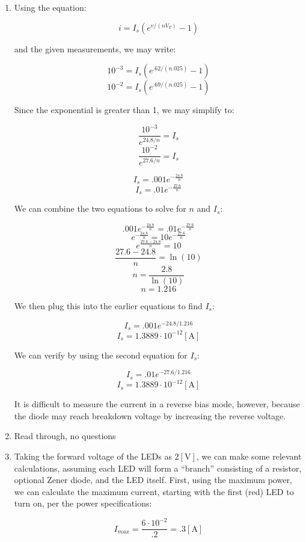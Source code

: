 \begin{enumerate}

  \item

    Using the equation:

    $$i=I_s\left( e^{v/(nV_T)}-1 \right)$$

    and the given measurements, we may write:

    $$10^{-3}=I_s\left( e^{.62/(n.025)}-1 \right)$$
    $$10^{-2}=I_s\left( e^{.69/(n.025)}-1 \right)$$

    Since the exponential is greater than 1, we may simplify to:

    $$\frac{10^{-3}}{e^{24.8/n}}=I_s$$
    $$\frac{10^{-2}}{e^{27.6/n}}=I_s$$

    $$I_s=.001e^{-\frac{24.8}{n}}$$
    $$I_s=.01e^{-\frac{27.6}{n}}$$

    We can combine the two equations to solve for $n$ and $I_s$:

    $$.001e^{-\frac{24.8}{n}}=.01e^{-\frac{27.6}{n}}$$
    $$e^{-\frac{24.8}{n}}=10e^{-\frac{27.6}{n}}$$
    $$e^{\frac{27.6-24.8}{n}}=10$$
    $$\frac{27.6-24.8}{n}=\ln(10)$$
    $$n=\frac{2.8}{\ln(10)}$$
    $$\boxed{n=1.216}$$

    We then plug this into the earlier equations to find $I_s$:

    $$I_s=.001e^{-24.8/1.216}$$
    $$\boxed{I_s=1.3889\cdot10^{-12}[\si{\ampere}]}$$

    We can verify by using the second equation for $I_s$:

    $$I_s=.01e^{-27.6/1.216}$$
    $$\boxed{I_s=1.3889\cdot10^{-12}[\si{\ampere}]}$$

    It is difficult to measure the current in a reverse bias mode, however, because the diode may reach breakdown voltage by increasing the reverse voltage.

  \item Read through, no questions \textcolor{green}{\checkmark}

  \item Taking the forward voltage of the LEDs as $2[\si{\volt}]$, we can make some relevant calculations, assuming each LED will form a ``branch'' consisting of a resistor, optional Zener diode, and the LED itself. First, using the maximum power, we can calculate the maximum current, starting with the first (red) LED to turn on, per the power specifications:

    $$I_{max}=\frac{6\cdot10^{-2}}{.2}=.3[\si{\ampere}]$$


\end{enumerate}
